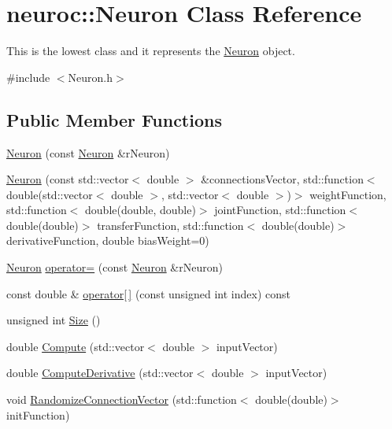 \hypertarget{classneuroc_1_1_neuron}{\section{neuroc\-:\-:Neuron Class Reference}
\label{classneuroc_1_1_neuron}
}


This is the lowest class and it represents the \hyperlink{classneuroc_1_1_neuron}{Neuron} object.  




{\ttfamily \#include $<$Neuron.\-h$>$}

\subsection*{Public Member Functions}
\begin{DoxyCompactItemize}
\item 
\hyperlink{classneuroc_1_1_neuron_a5daa71d6894902abd4d176fb98b2a1a3}{Neuron} (const \hyperlink{classneuroc_1_1_neuron}{Neuron} \&r\-Neuron)
\item 
\hyperlink{classneuroc_1_1_neuron_a2d47b91447450bc164ac3b953bf4a02f}{Neuron} (const std\-::vector$<$ double $>$ \&connections\-Vector, std\-::function$<$ double(std\-::vector$<$ double $>$, std\-::vector$<$ double $>$)$>$ weight\-Function, std\-::function$<$ double(double, double)$>$ joint\-Function, std\-::function$<$ double(double)$>$ transfer\-Function, std\-::function$<$ double(double)$>$ derivative\-Function, double bias\-Weight=0)
\item 
\hyperlink{classneuroc_1_1_neuron}{Neuron} \hyperlink{classneuroc_1_1_neuron_a50f9501ff50f8cba29509adf982d276e}{operator=} (const \hyperlink{classneuroc_1_1_neuron}{Neuron} \&r\-Neuron)
\item 
const double \& \hyperlink{classneuroc_1_1_neuron_aebf0a0ac505ed3d030a2317f7e8db166}{operator\mbox{[}$\,$\mbox{]}} (const unsigned int index) const 
\item 
unsigned int \hyperlink{classneuroc_1_1_neuron_a015376f3e8345e7d831298d4342eef3f}{Size} ()
\item 
double \hyperlink{classneuroc_1_1_neuron_aeb1a05ddba04af38d8ab9fd88d74ba69}{Compute} (std\-::vector$<$ double $>$ input\-Vector)
\item 
double \hyperlink{classneuroc_1_1_neuron_abaed7c93f8aae60f91a353ec55663df3}{Compute\-Derivative} (std\-::vector$<$ double $>$ input\-Vector)
\item 
void \hyperlink{classneuroc_1_1_neuron_a9fbb34828b715886d122765d9889f000}{Randomize\-Connection\-Vector} (std\-::function$<$ double(double)$>$ init\-Function)

\end{DoxyCompactItemize}
